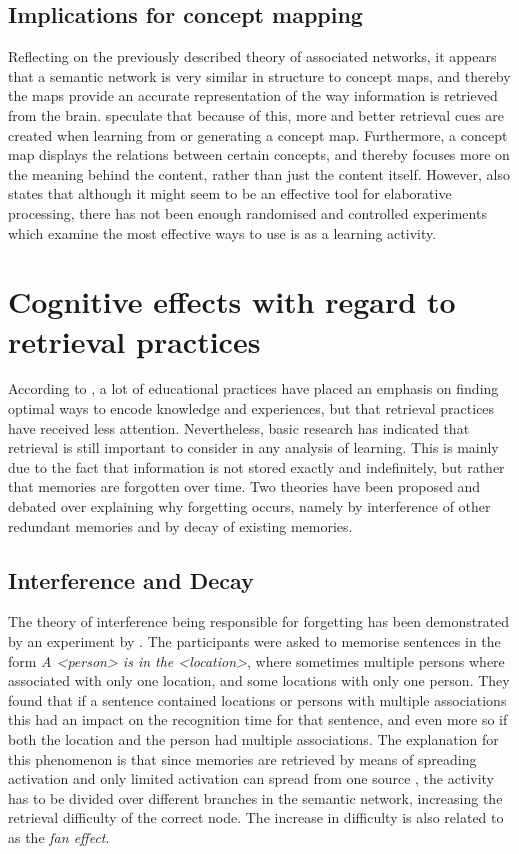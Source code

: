 \subsection{Implications for concept mapping}

Reflecting on the previously described theory of associated networks, it appears that a semantic network is very similar in structure to concept maps, and thereby the maps provide an accurate representation of the way information is retrieved from the brain.  speculate that because of this, more and better retrieval cues are created when learning from or generating a concept map. Furthermore, a concept map displays the relations between certain concepts, and thereby focuses more on the meaning behind the content, rather than just the content itself. However,  also states that although it might seem to be an effective tool for elaborative processing, there has not been enough randomised and controlled experiments which examine the most effective ways to use is as a learning activity.

\section{Cognitive effects with regard to retrieval practices}

According to , a lot of educational practices have placed an emphasis on finding optimal ways to encode knowledge and experiences, but that retrieval practices have received less attention. Nevertheless, basic research has indicated that retrieval is still important to consider in any analysis of learning. This is mainly due to the fact that information is not stored exactly and indefinitely, but rather that memories are forgotten over time. Two theories have been proposed and debated over explaining why forgetting occurs, namely by interference of other redundant memories and by decay of existing memories.

\subsection{Interference and Decay}

The theory of interference being responsible for forgetting has been demonstrated by an experiment by . The participants were asked to memorise sentences in the form \emph{A \textless person\textgreater{} is in the \textless location\textgreater}, where sometimes multiple persons where associated with only one location, and some locations with only one person. They found that if a sentence contained locations or persons with multiple associations this had an impact on the recognition time for that sentence, and even more so if both the location and the person had multiple associations. The explanation for this phenomenon is that since memories are retrieved by means of spreading activation and only limited activation can spread from one source \cite{cognitivepsychology}, the activity has to be divided over different branches in the semantic network, increasing the retrieval difficulty of the correct node. The increase in difficulty is also related to as the \emph{fan effect}.

